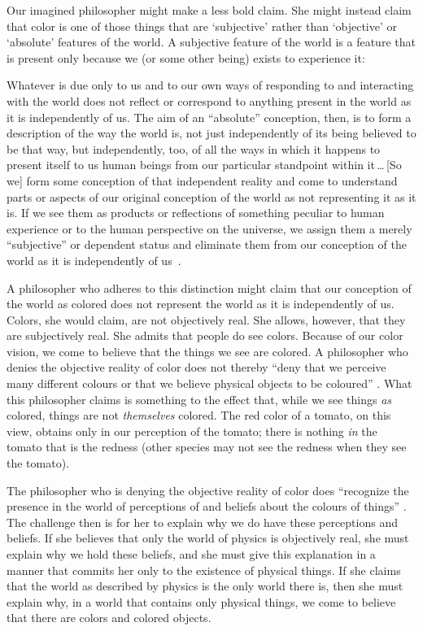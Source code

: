 \documentclass[11pt]{standalone}
\newenvironment{squote}{%
	\begin{spacing}{1}
	\begin{list}{}{%
	\setlength{\labelwidth}{0pt}%
	\rightmargin\leftmargin%
	}
	\item\relax
	}{%
	\end{list}%
	\end{spacing}
	}
\begin{document}
\begin{spacing}{1.5}
Our imagined philosopher might make a less bold claim.  She might
instead claim that color is one of those things that are `subjective'
rather than `objective' or `absolute' features of the world.  A
subjective feature of the world is a feature that is present only
because we (or some other being) exists to experience it:

\begin{squote}
Whatever is due only to us and to our own ways of responding to and
interacting with the world does not reflect or correspond to anything
present in the world as it is independently of us.  The aim of an
``absolute'' conception, then, is to form a description of the way the
world is, not just independently of its being believed to be that way,
but independently, too, of all the ways in which it happens to present
itself to us human beings from our particular standpoint within
it\,\ldots\,[So we] form some conception of that independent reality
and come to understand parts or aspects of our original conception of
the world as not representing it as it is.  If we see them as products
or reflections of something peculiar to human experience or to the
human perspective on the universe, we assign them a merely
``subjective'' or dependent status and eliminate them from our
conception of the world as it is independently of
us~\citep[30--31]{stroud2000a}.
\end{squote}

A philosopher who adheres to this distinction might claim that our
conception of the world as colored does not represent the world as it
is independently of us.  Colors, she would claim, are not objectively
real.  She allows, however, that they are subjectively real.  She
admits that people do see colors.  Because of our color vision, we
come to believe that the things we see are colored.  A philosopher who
denies the objective reality of color does not thereby ``deny that we
perceive many different colours or that we believe physical objects to
be coloured'' \citep[145]{stroud2000a}.  What this philosopher claims
is something to the effect that, while we see things {\em as} colored,
things are not {\em themselves} colored.  The red color of a tomato,
on this view, obtains only in our perception of the tomato; there is
nothing {\em in} the tomato that is the redness (other species may not
see the redness when they see the tomato).

The philosopher who is denying the objective reality of color does
``recognize the presence in the world of perceptions of and beliefs
about the colours of things'' \citep[199]{stroud2000a}.  The challenge
then is for her to explain why we do have these perceptions and
beliefs.  If she believes that only the world of physics is
objectively real, she must explain why we hold these beliefs, and she
must give this explanation in a manner that commits her only to the
existence of physical things.  If she claims that the world as
described by physics is the only world there is, then she must explain
why, in a world that contains only physical things, we come to believe
that there are colors and colored objects.


\end{spacing}
\end{document}
